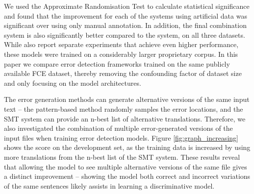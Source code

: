 \documentclass[11pt,letterpaper]{article}
\begin{document}
We used the Approximate Randomisation Test \cite{Noreen1989,Cohen1995} to calculate statistical significance and found that the improvement for each of the systems using artificial data was significant over using only manual annotation. In addition, the final combination system is also significantly better compared to the  system, on all three datasets.
While  also report separate experiments that achieve even higher performance, these models were trained on a considerably larger proprietary corpus.
In this paper we compare error detection frameworks trained on the same publicly available FCE dataset, thereby removing the confounding factor of dataset size and only focusing on the model architectures.

The error generation methods can generate alternative versions of the same input text -- the pattern-based method randomly samples the error locations, and the SMT system can provide an n-best list of alternative translations. Therefore, we also investigated the combination of multiple error-generated versions of the input files when training error detection models.
Figure \ref{fig:graph_increasing} shows the  score on the development set, as the training data is increased by using more translations from the n-best list of the SMT system. 
These results reveal that allowing the model to see multiple alternative versions of the same file gives a distinct improvement -- showing the model both correct and incorrect variations of the same sentences likely assists in learning a discriminative model.





\iffalse
\begin{figure}[t]
	\centering
	\texttt{[image: graph\_artdata\_increasing.png]}
	\caption{ on FCE development set with increasing amounts of artificial data from SMT.}
	\label{fig:graph_increasing}
\end{figure}
\fi
\end{document}
